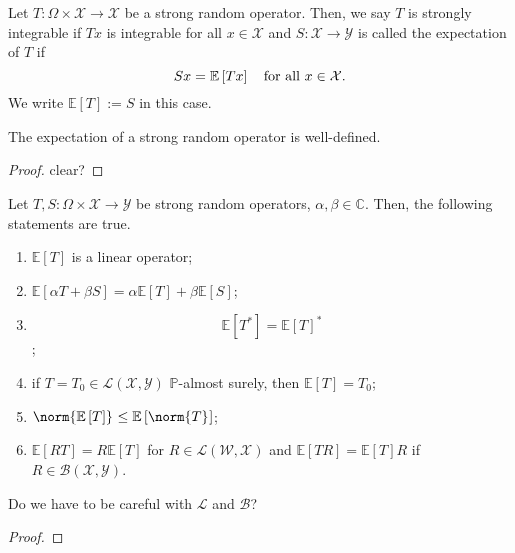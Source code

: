 \begin{defn}
    Let \( T: \Omega \times \mathcal{X} \to \mathcal{X} \) be a strong random operator. Then, we say \( T \) is strongly integrable if \( Tx \) is integrable for all \( x \in \mathcal{X} \) and \( S: \mathcal{X} \to \mathcal{Y} \) is called the expectation of \( T \) if 
    \[ Sx = \mathbb{E}\left[Tx\right] \quad \text{for all \( x \in \mathcal{X} \)}.\]
    We write \( \mathbb{E}\left[T\right]:=S \) in this case.
\end{defn}


\begin{lem}
    The expectation of a strong random operator is well-defined.
\end{lem}

\begin{proof}
    clear?
\end{proof}


\begin{lem}
    Let \( T,S :\Omega \times \mathcal{X} \to \mathcal{Y} \) be strong random operators, \( \alpha, \beta \in \mathbb{C} \). Then, the following statements are true.
    \begin{enumerate}[1)]
      \item \( \mathbb{E}\left[T\right] \) is a linear operator;
      \item \( \mathbb{E}\left[\alpha T + \beta S\right]= \alpha \mathbb{E}\left[T\right] + \beta \mathbb{E}\left[S\right] \);
      \item \[ \mathbb{E}\left[T^{*}\right]= \mathbb{E}\left[T\right]^{*} \];
      \item if \( T=T_0 \in \mathcal{L}(\mathcal{X},\mathcal{Y}) \) \( \mathbb{P} \)-almost surely, then \( \mathbb{E}[T]=T_0 \);
      \item \( \norm{\mathbb{E}\left[T\right]}_{} \leq \mathbb{E}\left[\norm{T}_{}\right] \);
      \item \( \mathbb{E}\left[RT\right]= R \mathbb{E}\left[T\right] \) for \( R \in \mathcal{L}(\mathcal{W},\mathcal{X}) \) and \( \mathbb{E}[TR]= \mathbb{E}[T]R \) if \( R \in \mathcal{B}(\mathcal{X},\mathcal{Y}) \). 
    \end{enumerate}
    
\end{lem}
Do we have to be careful with \( \mathcal{L} \) and \( \mathcal{B} \)?

\begin{proof}
    
\end{proof}


